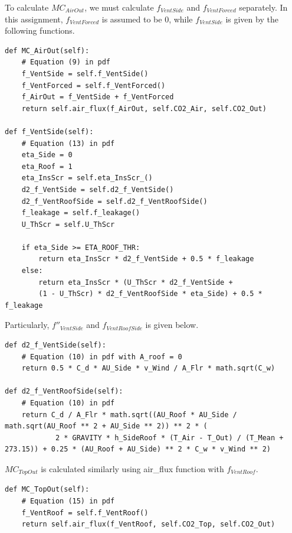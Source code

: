 \documentclass[a4paper]{article}
\numberwithin{equation}{section}
\begin{document}
To calculate \(MC_{AirOut}\), we must calculate \(f_{VentSide}\) and \(f_{VentForced}\) separately.
In this assignment, \(f_{VentForced}\) is assumed to be 0, while \(f_{VentSide}\) is given by the following functions.

\begin{mdframed}[leftline=false,rightline=false,backgroundcolor=magenta!10,nobreak=true]
  \begin{verbatim}
def MC_AirOut(self):
    # Equation (9) in pdf
    f_VentSide = self.f_VentSide()
    f_VentForced = self.f_VentForced()
    f_AirOut = f_VentSide + f_VentForced
    return self.air_flux(f_AirOut, self.CO2_Air, self.CO2_Out)
    
def f_VentSide(self):
    # Equation (13) in pdf
    eta_Side = 0
    eta_Roof = 1
    eta_InsScr = self.eta_InsScr_()
    d2_f_VentSide = self.d2_f_VentSide()
    d2_f_VentRoofSide = self.d2_f_VentRoofSide()
    f_leakage = self.f_leakage()
    U_ThScr = self.U_ThScr

    if eta_Side >= ETA_ROOF_THR:
        return eta_InsScr * d2_f_VentSide + 0.5 * f_leakage
    else:
        return eta_InsScr * (U_ThScr * d2_f_VentSide + 
        (1 - U_ThScr) * d2_f_VentRoofSide * eta_Side) + 0.5 * f_leakage
  \end{verbatim}
\end{mdframed}

Particularly, \(f''_{VentSide}\) and \(f_{VentRoofSide}\) is given below.
\begin{mdframed}[leftline=false,rightline=false,backgroundcolor=magenta!10,nobreak=true]
  \begin{verbatim}
def d2_f_VentSide(self):
    # Equation (10) in pdf with A_roof = 0
    return 0.5 * C_d * AU_Side * v_Wind / A_Flr * math.sqrt(C_w)
    
def d2_f_VentRoofSide(self):
    # Equation (10) in pdf
    return C_d / A_Flr * math.sqrt((AU_Roof * AU_Side / math.sqrt(AU_Roof ** 2 + AU_Side ** 2)) ** 2 * (
            2 * GRAVITY * h_SideRoof * (T_Air - T_Out) / (T_Mean + 273.15)) + 0.25 * (AU_Roof + AU_Side) ** 2 * C_w * v_Wind ** 2)
  \end{verbatim}
\end{mdframed}

\(MC_{TopOut}\) is calculated similarly using air\_flux function with \(f_{VentRoof}\).
\begin{mdframed}[leftline=false,rightline=false,backgroundcolor=magenta!10,nobreak=true]
  \begin{verbatim}
def MC_TopOut(self):
    # Equation (15) in pdf
    f_VentRoof = self.f_VentRoof()
    return self.air_flux(f_VentRoof, self.CO2_Top, self.CO2_Out)
  \end{verbatim}
\end{mdframed}
\end{document}
